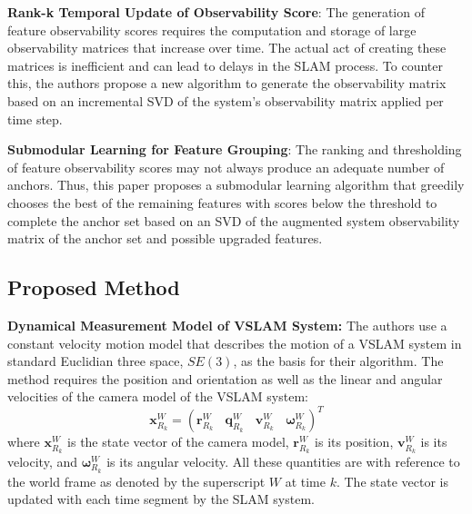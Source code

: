 \documentclass[10pt,twocolumn,letterpaper]{article}
\begin{document}
\textbf{Rank-k Temporal Update of Observability Score}: The generation of feature observability 
scores requires 
the computation and storage of large observability matrices that increase over time. 
The actual act of creating these matrices is inefficient and can lead to delays 
in the SLAM process. To counter this, the authors propose a new algorithm to generate the 
observability matrix 
based on an incremental SVD of the system's observability matrix applied per time step.

\textbf{Submodular Learning for Feature Grouping}: The ranking and thresholding of feature 
observability scores may not 
always produce an adequate number of anchors. 
Thus, this paper proposes a submodular learning algorithm that 
greedily chooses the best of the remaining features with scores 
below the threshold to complete the anchor set based on an 
SVD of the augmented system observability matrix of the anchor set and possible upgraded features. 

\subsection{Proposed Method}
\textbf{Dynamical Measurement Model of VSLAM System:}
The authors use a constant velocity motion model that describes the motion of a VSLAM system in standard 
Euclidian three space, 
$SE(3)$, as the basis for their algorithm. The method requires the position and orientation as well as the linear 
and angular velocities of the camera model of the VSLAM system: 
\begin{equation} \label{eq:stateVector}
\boldsymbol{x}_{R_k}^W = (\boldsymbol{r}_{R_k}^W \ \ \ \  \boldsymbol{q}_{R_k}^W  \ \ \ \  \boldsymbol{v}_{R_k}^W  \ \ \ \  \boldsymbol{\omega}_{R_k}^W)^T
\end{equation}
where $\boldsymbol{x}_{R_k}^W$ is the state vector of the camera model, 
$\boldsymbol{r}_{R_k}^W$ is its position, 
$\boldsymbol{v}_{R_k}^W$ is its velocity, 
and $\boldsymbol{\omega}_{R_k}^W$ is its angular velocity. All these quantities are with reference to the world frame as denoted by the superscript $W$ at time $k$. 
The state vector is updated with each time segment by the SLAM system. 
\end{document}
